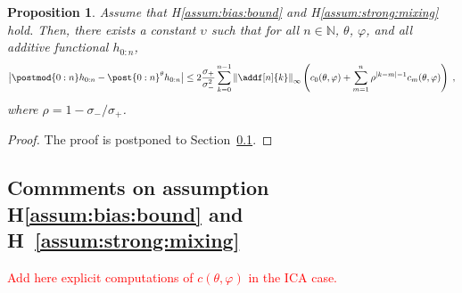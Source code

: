 \documentclass{article}
\newtheorem{proposition}[theorem]{Proposition}
\newcommand{\udlow}{\sigma_-}
\newcommand{\udup}{\sigma_+}
\newcommand{\nset}{\mathbb{N}}
\newcommand{\1}{\mathbbm{1}}
\newcommand{\parvec}{\theta}
\newcommand{\eqsp}{\;}
\begin{document}
\begin{proposition}
\label{prop:bias}
Assume that H\ref{assum:bias:bound} and H\ref{assum:strong:mixing} hold. Then, there exists a constant $\upsilon$ such that for all $n \in \nset$, $\parvec$, $\varphi$, and all additive functional $h_{0:n}$,  
$$
        \big| \postmod{0:n} h_{0:n} -  \post{0:n}^{\parvec} h_{0:n} \big| 
        \leq 2\frac{\sigma_+}{\sigma_-^2}\sum_{k=0}^{n-1}\left\| \addf[n]{k}\right\|_\infty\left( c_0(\theta,\varphi) + \sum_{m=1}^n \rho^{|k-m|-1}c_m(\theta,\varphi)\right)\eqsp,%
$$
where $\rho = 1-\sigma_-/\sigma_+$.
\end{proposition}

\begin{proof}
The proof is postponed to Section~\ref{sec:assumptions}.
\end{proof}

\subsection{Commments on assumption H\ref{assum:bias:bound} and H~\ref{assum:strong:mixing}}
\label{sec:assumptions}
\textcolor{red}{Add here explicit computations of $c(\theta,\varphi)$ in the ICA case.}
\end{document}
